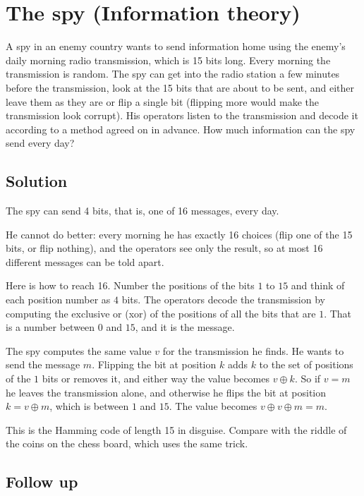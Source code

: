 \section {The spy (Information theory)}

A spy in an enemy country wants to send information home using the enemy's daily morning radio transmission, which is 15 bits long.
Every morning the transmission is random. The spy can get into the radio station a few minutes before the transmission, look at the 15 bits that are about to be
sent, and either leave them as they are or flip a single bit (flipping more would make the transmission look corrupt).
His operators listen to the transmission and decode it according to a method agreed on in advance.
How much information can the spy send every day?

\subsection{Solution}

The spy can send 4 bits, that is, one of 16 messages, every day.

He cannot do better: every morning he has exactly 16 choices (flip one of the 15 bits, or flip nothing),
and the operators see only the result, so at most 16 different messages can be told apart.

Here is how to reach 16. Number the positions of the bits $1$ to $15$ and think of each position number as $4$ bits.
The operators decode the transmission by computing the exclusive or (xor) of the positions of all the bits that are $1$.
That is a number between $0$ and $15$, and it is the message.

The spy computes the same value $v$ for the transmission he finds. He wants to send the message $m$.
Flipping the bit at position $k$ adds $k$ to the set of positions of the $1$ bits or removes it, and either way the value becomes $v \oplus k$.
So if $v = m$ he leaves the transmission alone, and otherwise he flips the bit at position $k = v \oplus m$, which is between $1$ and $15$.
The value becomes $v \oplus v \oplus m = m$.

This is the Hamming code of length 15 in disguise. Compare with the riddle of the coins on the chess board, which uses the same trick.

\subsection{Follow up}

